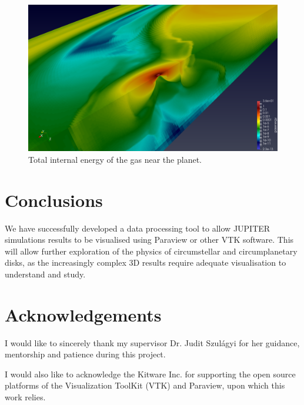 \documentclass[twocolumn]{aastex62}
\begin{document}
\begin{figure}[t]
	\centering
	\includegraphics[width=0.9\linewidth]{figures/GasEnergy1.png}
	\caption{\label{ref:energy}Total internal energy of the gas near the planet.}
\end{figure}
\section{Conclusions}\label{sec:con}
We have successfully developed a data processing tool to allow JUPITER simulations results to be visualised using Paraview or other VTK software. This will allow further exploration of the physics of circumstellar and circumplanetary disks, as the increasingly complex 3D results require adequate visualisation to understand and study. 
\section{Acknowledgements}
I would like to sincerely thank my supervisor Dr. Judit Szul\'{a}gyi for her guidance, mentorship and patience during this project.

I would also like to acknowledge the Kitware Inc. for supporting the open source platforms of the Visualization ToolKit (VTK)  and Paraview, upon which this work relies.

 

\end{document}
